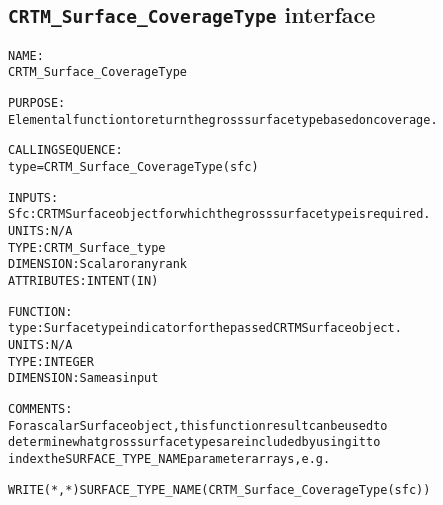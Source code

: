 \subsection{\texttt{CRTM\_Surface\_CoverageType} interface}
  \label{sec:CRTM_Surface_CoverageType_interface}
  \begin{alltt}
 
  NAME:
        CRTM_Surface_CoverageType
 
  PURPOSE:
        Elemental function to return the gross surface type based on coverage.
 
  CALLING SEQUENCE:
        type = CRTM_Surface_CoverageType( sfc )
 
  INPUTS:
        Sfc:  CRTM Surface object for which the gross surface type is required.
              UNITS:      N/A
              TYPE:       CRTM_Surface_type
              DIMENSION:  Scalar or any rank
              ATTRIBUTES: INTENT(IN)
 
  FUNCTION:
        type: Surface type indicator for the passed CRTM Surface object.
              UNITS:      N/A
              TYPE:       INTEGER
              DIMENSION:  Same as input
 
  COMMENTS:
        For a scalar Surface object, this function result can be used to
        determine what gross surface types are included by using it to
        index the SURFACE_TYPE_NAME parameter arrays, e.g.
 
          WRITE(*,*) SURFACE_TYPE_NAME(CRTM_Surface_CoverageType(sfc))
  \end{alltt}
